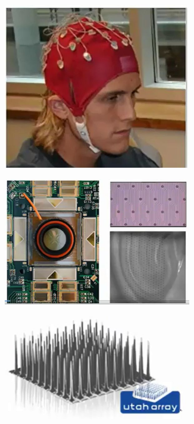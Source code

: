 \documentclass[]{article}
\begin{document}
\begin{figure}[H]
\begin{subfigure}[t]{0.45\textwidth}
	\end{subfigure}
	\begin{subfigure}[t]{0.3\textwidth}
		\caption{}\label{fig:rb3}
		\includegraphics[width=0.9\textwidth]{EEG}
	\end{subfigure}
	\begin{subfigure}[t]{0.3\textwidth}
		\caption{}\label{fig:rb4}
		\includegraphics[width=0.9\textwidth]{electrode-arrays}
	\end{subfigure}
	\begin{subfigure}[t]{0.3\textwidth}
		\caption{}\label{fig:rb5}
		\includegraphics[width=0.9\textwidth]{electrode-arrays2}

\end{subfigure}
\end{figure}
\end{document}

